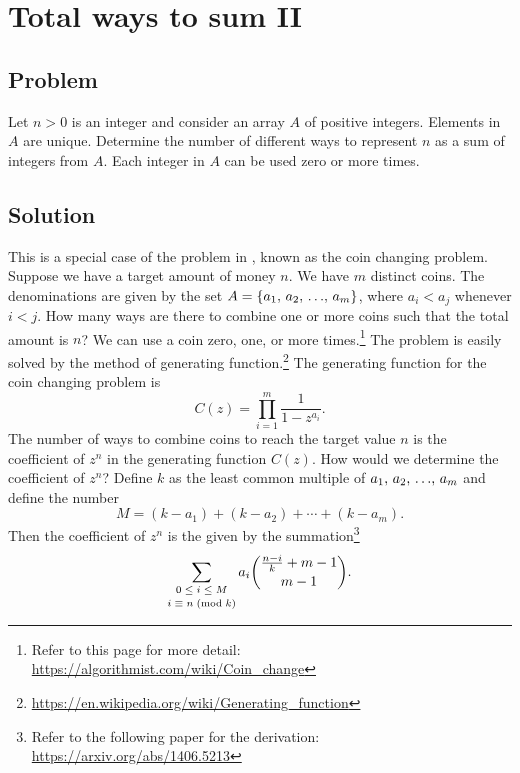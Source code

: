 
\section{Total ways to sum II}



\subsection*{Problem}

Let $n > 0$ is an integer and consider an array $A$ of positive
integers.  Elements in $A$ are unique.  Determine the number of
different ways to represent $n$ as a sum of integers from $A$.  Each
integer in $A$ can be used zero or more times.



\subsection*{Solution}

This is a special case of the problem
in , known as the coin changing
problem.  Suppose we have a target amount of money $n$.  We have $m$
distinct coins.  The denominations are given by the set
$A = \left\{{{a}_1},\, {{a}_2},\, {\dots},\, {{a}_{m}}\right\}$, where $a_i < a_j$ whenever $i < j$.  How many
ways are there to combine one or more coins such that the total amount
is $n$?  We can use a coin zero, one, or more times.\footnote{
  Refer to this page for more detail:
  \url{https://algorithmist.com/wiki/Coin_change}
}
The problem is easily solved by the method of generating
function.\footnote{
  \url{https://en.wikipedia.org/wiki/Generating_function}
}
The generating function for the coin changing problem is
\[
C(z)
=
\prod_{i=1}^{m}
\frac{
  1
}{
  1 - z^{a_i}
}.
\]
The number of ways to combine coins to reach the target value $n$ is
the coefficient of $z^n$ in the generating function $C(z)$.  How would
we determine the coefficient of $z^n$?  Define $k$ as the least common
multiple of ${{a}_1},\, {{a}_2},\, {\dots},\, {{a}_{m}}$ and define the number
\[
M
=
(k - a_1)
+
(k - a_2)
+
\cdots
+
(k - a_m).
\]
Then the coefficient of $z^n$ is the given by the summation\footnote{
  Refer to the following paper for the derivation:
  \url{https://arxiv.org/abs/1406.5213}
}
\[
\sum_{\substack{0 \; \leq \; i \; \leq \; M\\[2pt] {i} \; \equiv \; {n} \; (\text{mod}\; {k})}}
a_i
\binom{
  \frac{n-i}{k} + m - 1
}{
  m - 1
}.
\]

